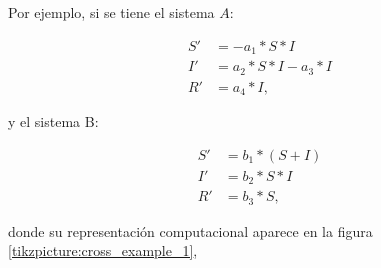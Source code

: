 Por ejemplo, si se tiene el sistema $A$:

\begin{align*}
    S' & = - a_1 * S * I         \\
    I' & = a_2 * S * I - a_3 * I \\
    R' & = a_4 * I,
\end{align*}

y el sistema B:

\begin{align*}
    S' & = b_1 * (S + I) \\
    I' & = b_2 * S * I   \\
    R' & = b_3 * S,
\end{align*}

donde su representación computacional aparece en la figura \ref{tikzpicture:cross_example_1},

